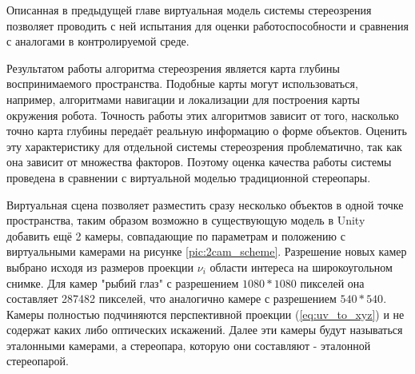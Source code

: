 Описанная в предыдущей главе виртуальная модель системы стереозрения позволяет проводить 
с ней испытания для оценки работоспособности и сравнения с аналогами в контролируемой среде.            %

Результатом работы алгоритма стереозрения является карта глубины воспринимаемого пространства. Подобные карты могут
использоваться, например, алгоритмами навигации и локализации для построения карты окружения робота. Точность работы 
этих алгоритмов зависит от того, насколько точно карта глубины передаёт реальную информацию о форме объектов. Оценить 
эту характеристику для отдельной системы стереозрения проблематично, так как она зависит от множества факторов.         %
Поэтому оценка качества работы системы проведена в сравнении с виртуальной моделью традиционной стереопары.

Виртуальная сцена позволяет разместить сразу несколько объектов в одной точке пространства, таким образом возможно
в существующую модель в Unity добавить ещё 2 камеры, совпадающие по параметрам и положению с виртуальными камерами на 
рисунке \ref{pic:2cam_scheme}. Разрешение новых камер выбрано исходя из размеров проекции $\nu_i$ области интереса на широкоугольном
снимке. Для камер "рыбий глаз" с разрешением $1080*1080$ пикселей она составляет 287482 пикселей, что аналогично камере 
с разрешением $540*540$. Камеры полностью подчиняются перспективной проекции (\ref{eq:uv_to_xyz}) и не содержат каких либо оптических искажений.
 Далее эти камеры будут называться эталонными камерами, а стереопара, которую они составляют - эталонной стереопарой. %
